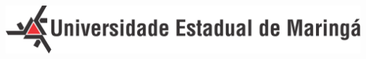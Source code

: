 \documentclass[
	12pt,				%
	openright,			%
	oneside,			%
	a4paper,			%
	english,			%
	french,				%
	spanish,			%
	brazil				%
	]{abntex2}
\begin{document}
\begin{minipage}[c][0cm][c]{0cm} %

\centering

\includegraphics[scale=0.45]{../../Pictures/uem-modelo-04.png}  
\end{minipage}


\frenchspacing 


\imprimircapa



 
 


\tableofcontents*
\cleardoublepage
\end{document}
